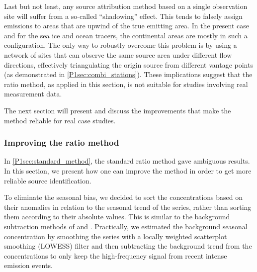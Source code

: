         Last but not least, any source attribution method based on a single observation site will suffer from a so-called ``shadowing'' effect. This tends to falsely assign emissions to areas that are upwind of the true emitting area. In the present case and for the sea ice and ocean tracers, the continental areas are mostly in such a configuration. The only way to robustly overcome this problem is by using a network of sites that can observe the same source area under different flow directions, effectively triangulating the origin source from different vantage points (as demonstrated in \cref{P1sec:combi_stations}).
        These implications suggest that the ratio method, as applied in this section, is not suitable for studies involving real measurement data.

        The next section will present and discuss the improvements that make the method reliable for real case studies.

    \subsubsection{Improving the ratio method}
        \label{P1sec:improved_method}

        In \cref{P1sec:standard_method}, the standard ratio method gave ambiguous results.
        In this section, we present how one can improve the method in order to get more reliable source identification.

        To eliminate the seasonal bias, we decided to sort the concentrations based on their anomalies in relation to the seasonal trend of the series, rather than sorting them according to their absolute values.
        This is similar to the background subtraction methods of \citet{ruckstuhl_robust_2012} and \citet{resovsky_algorithm_2021}. Practically, we estimated the background seasonal concentration by smoothing the series with a locally weighted scatterplot smoothing (LOWESS) filter and then subtracting the background trend from the concentrations to only keep the high-frequency signal from recent intense emission events.

